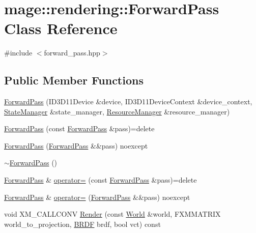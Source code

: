 \hypertarget{classmage_1_1rendering_1_1_forward_pass}{}\section{mage\+:\+:rendering\+:\+:Forward\+Pass Class Reference}
\label{classmage_1_1rendering_1_1_forward_pass}


{\ttfamily \#include $<$forward\+\_\+pass.\+hpp$>$}

\subsection*{Public Member Functions}
\begin{DoxyCompactItemize}
\item 
\hyperlink{classmage_1_1rendering_1_1_forward_pass_aabff6394203f0927f65cd9d591eefa58}{Forward\+Pass} (I\+D3\+D11\+Device \&device, I\+D3\+D11\+Device\+Context \&device\+\_\+context, \hyperlink{classmage_1_1rendering_1_1_state_manager}{State\+Manager} \&state\+\_\+manager, \hyperlink{classmage_1_1rendering_1_1_resource_manager}{Resource\+Manager} \&resource\+\_\+manager)
\item 
\hyperlink{classmage_1_1rendering_1_1_forward_pass_a5454d208d794e9ef2ae05c03e7b839fd}{Forward\+Pass} (const \hyperlink{classmage_1_1rendering_1_1_forward_pass}{Forward\+Pass} \&pass)=delete
\item 
\hyperlink{classmage_1_1rendering_1_1_forward_pass_a5f7026d7b4a439bdbacfeaf8fff152c1}{Forward\+Pass} (\hyperlink{classmage_1_1rendering_1_1_forward_pass}{Forward\+Pass} \&\&pass) noexcept
\item 
\hyperlink{classmage_1_1rendering_1_1_forward_pass_a9fdcc7dca5097f0feff2f7be92a2727c}{$\sim$\+Forward\+Pass} ()
\item 
\hyperlink{classmage_1_1rendering_1_1_forward_pass}{Forward\+Pass} \& \hyperlink{classmage_1_1rendering_1_1_forward_pass_a373b424f52fb5a209bed756dc06f47ee}{operator=} (const \hyperlink{classmage_1_1rendering_1_1_forward_pass}{Forward\+Pass} \&pass)=delete
\item 
\hyperlink{classmage_1_1rendering_1_1_forward_pass}{Forward\+Pass} \& \hyperlink{classmage_1_1rendering_1_1_forward_pass_aba2191f3e482d2fb0db2ad2cab77c817}{operator=} (\hyperlink{classmage_1_1rendering_1_1_forward_pass}{Forward\+Pass} \&\&pass) noexcept
\item 
void X\+M\+\_\+\+C\+A\+L\+L\+C\+O\+NV \hyperlink{classmage_1_1rendering_1_1_forward_pass_ae8d819c35db0b35afe309c00448d1c83}{Render} (const \hyperlink{classmage_1_1rendering_1_1_world}{World} \&world, F\+X\+M\+M\+A\+T\+R\+IX world\+\_\+to\+\_\+projection, \hyperlink{namespacemage_1_1rendering_ab8fe8684ca4bd74ba3a394b00cf125b5}{B\+R\+DF} brdf, bool vct) const

\end{DoxyCompactItemize}

